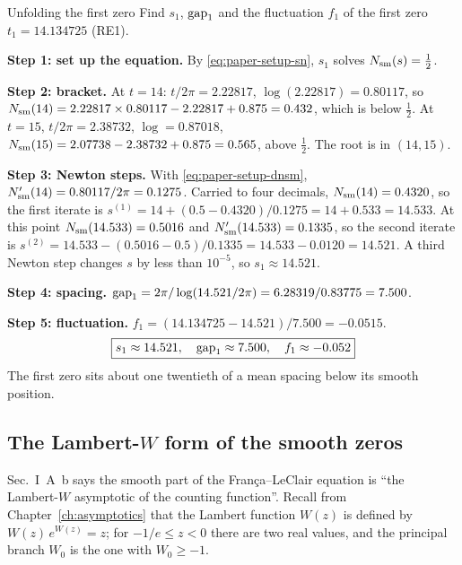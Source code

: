 \begin{sample}{Unfolding the first zero}
Find $s_1$, $\mathrm{gap}_1$ and the fluctuation $f_1$ of the first zero $t_1=14.134725$ (RE1).

\textbf{Step 1: set up the equation.} By \eqref{eq:paper-setup-sn}, $s_1$ solves $N_{\mathrm{sm}}(s)=\tfrac12$.

\textbf{Step 2: bracket.} At $t=14$: $t/2\pi=2.22817$, $\log(2.22817)=0.80117$, so $N_{\mathrm{sm}}(14)=2.22817\times0.80117-2.22817+0.875=0.432$, which is below $\tfrac12$. At $t=15$, $t/2\pi=2.38732$, $\log=0.87018$, $N_{\mathrm{sm}}(15)=2.07738-2.38732+0.875=0.565$, above $\tfrac12$. The root is in $(14,15)$.

\textbf{Step 3: Newton steps.} With \eqref{eq:paper-setup-dnsm}, $N_{\mathrm{sm}}'(14)=0.80117/2\pi=0.1275$. Carried to four decimals, $N_{\mathrm{sm}}(14)=0.4320$, so the first iterate is $s^{(1)}=14+(0.5-0.4320)/0.1275=14+0.533=14.533$. At this point $N_{\mathrm{sm}}(14.533)=0.5016$ and $N_{\mathrm{sm}}'(14.533)=0.1335$, so the second iterate is $s^{(2)}=14.533-(0.5016-0.5)/0.1335=14.533-0.0120=14.521$. A third Newton step changes $s$ by less than $10^{-5}$, so $s_1\approx14.521$.

\textbf{Step 4: spacing.} $\mathrm{gap}_1=2\pi/\log(14.521/2\pi)=6.28319/0.83775=7.500$.

\textbf{Step 5: fluctuation.} $f_1=(14.134725-14.521)/7.500=-0.0515$.
\[
\boxed{s_1\approx14.521,\quad \mathrm{gap}_1\approx7.500,\quad f_1\approx-0.052}
\]
The first zero sits about one twentieth of a mean spacing below its smooth position.
\end{sample}

\subsection{The Lambert-$W$ form of the smooth zeros}

Sec.~I~A~b says the smooth part of the Fran\c{c}a--LeClair equation is ``the Lambert-$W$ asymptotic of the counting function''. Recall from Chapter~\ref{ch:asymptotics} that the Lambert function $W(z)$ is defined by $W(z)\,e^{W(z)}=z$; for $-1/e\le z<0$ there are two real values, and the principal branch $W_0$ is the one with $W_0\ge-1$.

